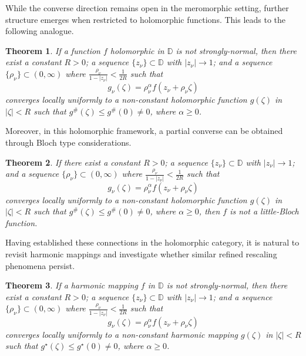 \documentclass[10pt,a4paper]{amsart}
\newtheorem{theorem}{Theorem}[section]
\numberwithin{equation}{section}
\begin{document}
While the converse direction remains open in the meromorphic setting, further structure emerges when
restricted to holomorphic functions. This leads to the following analogue.
\begin{theorem} \label{T:FPZPSNHF}
 If a function $f$ holomorphic in $\mathbb D$ is not strongly-normal, then there exist a constant $R>0$; 
 a sequence $\{z_{\nu}\}\subset \mathbb D$ with $|z_{\nu}|\to1$; and a sequence $\{\rho_{\nu} \}\subset (0,\infty)$ where
 $\displaystyle\frac{\rho_{\nu} }{1-|z_{\nu}|}<\frac{1}{2R}$ such that \begin{equation*}g_{\nu}(\zeta)=\rho_{\nu} ^{\alpha}f(z_{\nu}+\rho_{\nu} \zeta)\end{equation*}
    converges locally uniformly to a non-constant holomorphic function $g(\zeta)$ in $|\zeta|<R$ 
    such that $g^\#(\zeta)\le g^\#(0)\neq 0$, where $\alpha\geq 0$.
\end{theorem}   
Moreover, in this holomorphic framework, a partial converse can be obtained through Bloch type considerations.
\begin{theorem} \label{T:CPZPSNHF}
    If there exist a constant $R>0$; a sequence $\{z_{\nu}\}\subset \mathbb D$ with 
    $|z_{\nu}|\to1$; and a sequence $\{\rho_{\nu} \}\subset (0,\infty)$ where 
    $\displaystyle\frac{\rho_{\nu} }{1-|z_{\nu}|}<\frac{1}{2R}$ such that \begin{equation*}g_{\nu}(\zeta)=\rho_{\nu} ^{\alpha}f(z_{\nu}+\rho_{\nu} \zeta)\end{equation*}
    converges locally uniformly to a non-constant holomorphic function $g(\zeta)$ in $|\zeta|<R$ 
    such that $g^\#(\zeta)\le g^\#(0)\neq 0$, where $\alpha\geq 0$, then $f$ is not a little-Bloch function.
\end{theorem}
Having established these connections in the holomorphic category, it is natural to revisit
harmonic mappings and investigate whether similar refined rescaling phenomena persist.
\begin{theorem} \label{T:FPZPSNHMF}
    If a harmonic mapping $f$ in $\mathbb D$ is not strongly-normal, then there exist a constant 
    $R>0$; a sequence $\{z_{\nu}\}\subset \mathbb D$ with $|z_{\nu}|\to1$; and a sequence $\{\rho_{\nu} \}\subset (0,\infty)$ where 
    $\displaystyle\frac{\rho_{\nu} }{1-|z_{\nu}|}<\frac{1}{2R}$ such that \begin{equation*}g_{\nu}(\zeta)=\rho_{\nu} ^{\alpha}f(z_{\nu}+\rho_{\nu} \zeta)\end{equation*}
    converges locally uniformly to a non-constant harmonic mapping $g(\zeta)$ in $|\zeta|<R$ such 
    that $g^\star(\zeta)\le g^\star(0)\neq 0$, where $\alpha\geq 0$.
\end{theorem}
\end{document}
